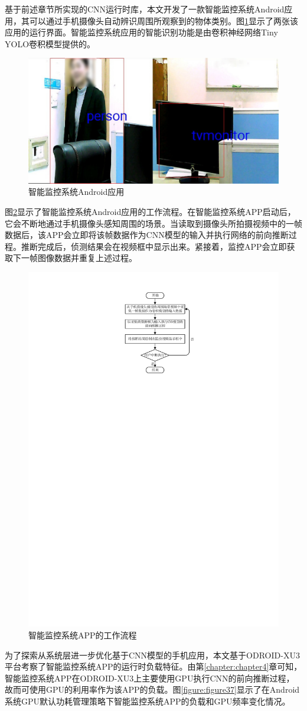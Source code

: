 基于前述章节所实现的CNN运行时库，本文开发了一款智能监控系统Android应用，其可以通过手机摄像头自动辨识周围所观察到的物体类别。图\ref{figure:figure31}显示了两张该应用的运行界面。智能监控系统应用的智能识别功能是由卷积神经网络Tiny YOLO\cite{pjreddie.com}卷积模型提供的。

\begin{figure}[htbp]
    \centering
    \includegraphics[height=0.4\textwidth]{figures/app.pdf}
    \caption{智能监控系统Android应用}\label{figure:figure31}
\end{figure}

图\ref{figure:figure36}显示了智能监控系统Android应用的工作流程。在智能监控系统APP启动后，它会不断地通过手机摄像头感知周围的场景。当读取到摄像头所拍摄视频中的一帧数据后，该APP会立即将该帧数据作为CNN模型的输入并执行网络的前向推断过程。推断完成后，侦测结果会在视频框中显示出来。紧接着，监控APP会立即获取下一帧图像数据并重复上述过程。

\begin{figure}[htbp]
    \centering
    \includegraphics[height=0.5\textwidth]{figures/app_process.pdf}
    \caption{智能监控系统APP的工作流程}\label{figure:figure36}
\end{figure}

为了探索从系统层进一步优化基于CNN模型的手机应用，本文基于ODROID-XU3平台考察了智能监控系统APP的运行时负载特征。由第\ref{chapter:chapter4}章可知，智能监控系统APP在ODROID-XU3上主要使用GPU执行CNN的前向推断过程，故而可使用GPU的利用率作为该APP的负载。图\ref{figure:figure37}显示了在Android系统GPU默认功耗管理策略下智能监控系统APP的负载和GPU频率变化情况。

